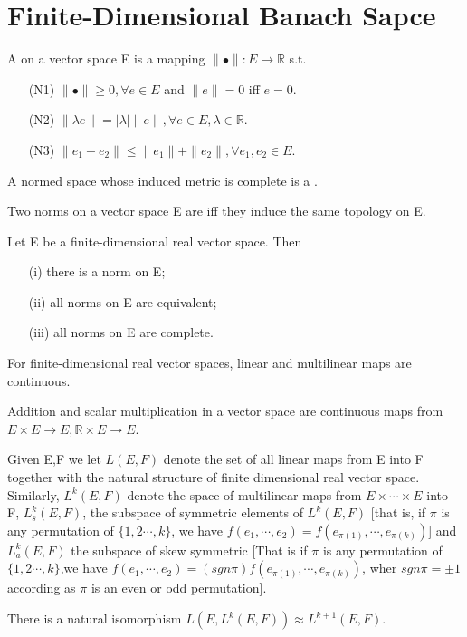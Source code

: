 \section{Finite-Dimensional Banach Sapce}
\begin{definition}
A  on a vector space E is a mapping $\parallel\bullet\parallel:E\rightarrow \mathbb{R}$ s.t.
\begin{enumerate}
\item[(N1)] $\parallel\bullet\parallel\geq 0, \forall e\in E$ and $\parallel e\parallel=0$ iff $e=0$.
\item[(N2)] $\parallel\lambda e\parallel=|\lambda|\parallel e\parallel, \forall e\in E, \lambda\in\mathbb{R}$.
\item[(N3)] $\parallel e_1+e_2\parallel\leq\parallel e_1\parallel+\parallel e_2\parallel, \forall e_1,e_2\in E$. 
\end{enumerate}
\end{definition}
A normed space whose induced metric is complete is a .
\begin{definition}
Two norms on a vector space E are  iff they induce the same topology on E.
\end{definition}
\begin{thm}
Let E be a finite-dimensional real vector space. Then
\begin{enumerate}
\item[(i)] there is a norm on E;
\item[(ii)] all norms on E are equivalent;
\item[(iii)] all norms on E are complete.
\end{enumerate}
\end{thm}
\begin{thm}
For finite-dimensional real vector spaces, linear and multilinear maps are continuous.
\end{thm}
\begin{cor}
Addition and scalar multiplication in a vector space are continuous maps from $E\times E\rightarrow E, \mathbb{R}\times E
\rightarrow E$.
\end{cor}
\begin{definition}
Given E,F we let $L(E,F)$ denote the set of all linear maps from E into F together with the natural structure of finite
dimensional real vector space. Similarly, $L^k(E,F)$ denote the space of multilinear maps from $E\times\cdots\times E$ into
F, $L_s^k(E,F)$, the subspace of symmetric elements of $L^k(E,F)$ [that is, if $\pi$ is any permutation of $\{1,2\cdots,k\}$,
we have $f(e_1,\cdots,e_2)=f(e_{\pi(1)},\cdots,e_{\pi(k)})$] and $L_a^k(E,F)$ the subspace of skew symmetric [That is 
if $\pi$ is any permutation of $\{1,2\cdots,k\}$,we have $f(e_1,\cdots,e_2)=(sgn \pi)f(e_{\pi(1)},\cdots,e_{\pi(k)})$, 
wher $sgn \pi = \pm 1$ according as $\pi$ is an even or odd permutation].
\end{definition}
\begin{thm}
There is a natural isomorphism $L(E,L^k(E,F))\approx L^{k+1}(E,F)$.
\end{thm}
